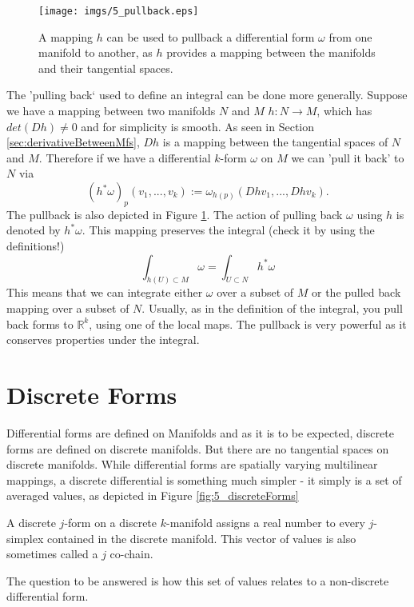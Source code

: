 \begin{figure}%
\begin{center}
\texttt{[image: imgs/5\_pullback.eps]}%
\end{center}
\caption{A mapping $h$ can be used to pullback a differential form $\omega$ from one manifold to another, as $h$ provides a mapping between the manifolds and their tangential spaces. }%
\label{fig:5_pullback}%
\end{figure}

The 'pulling back` used to define an integral can be done more generally. Suppose we have a mapping between two manifolds $N$ and $M$ $h: N\to M$, which has $det(Dh) \neq 0$ and for simplicity  is smooth. As seen in Section \ref{sec:derivativeBetweenMfs}, $Dh$ is a mapping between the tangential spaces of $N$ and $M$. Therefore if we have a differential $k$-form $\omega$ on $M$ we can 'pull it back' to $N$ via
\[(h^*\omega)_p (v_1,...,v_k) := \omega_{h(p)}(Dh v_1,...,Dh v_k). \]
The pullback is also depicted in Figure \ref{fig:5_pullback}. The action of pulling back $\omega$ using $h$ is denoted by $h^* \omega$. This mapping preserves the integral (check it by using the definitions!)
\[\int_{h(U)\subset M} \omega = \int_{U \subset N} h^*\omega \]
This means that we can integrate either $\omega$ over a subset of $M$ or the pulled back mapping over a subset of $N$. Usually, as in the definition of the integral, you pull back forms to $\mathbb R^k$, using one of the local maps.
The pullback is very powerful as it conserves properties under the integral. 

\section{Discrete Forms}
Differential forms are defined on Manifolds and as it is to be expected, discrete forms are defined on discrete manifolds. But there are no tangential spaces on discrete manifolds. While differential forms are spatially varying multilinear mappings, a discrete differential is something much simpler - it simply is a set of averaged values, as depicted in Figure \ref{fig:5_discreteForms}

\begin{definition}
A discrete $j$-form on a discrete $k$-manifold assigns a real number to every $j$-simplex contained in the discrete manifold. This vector of values is also sometimes called a $j$ co-chain. 
\end{definition}
The question to be answered is how this set of values relates to a non-discrete differential form.


